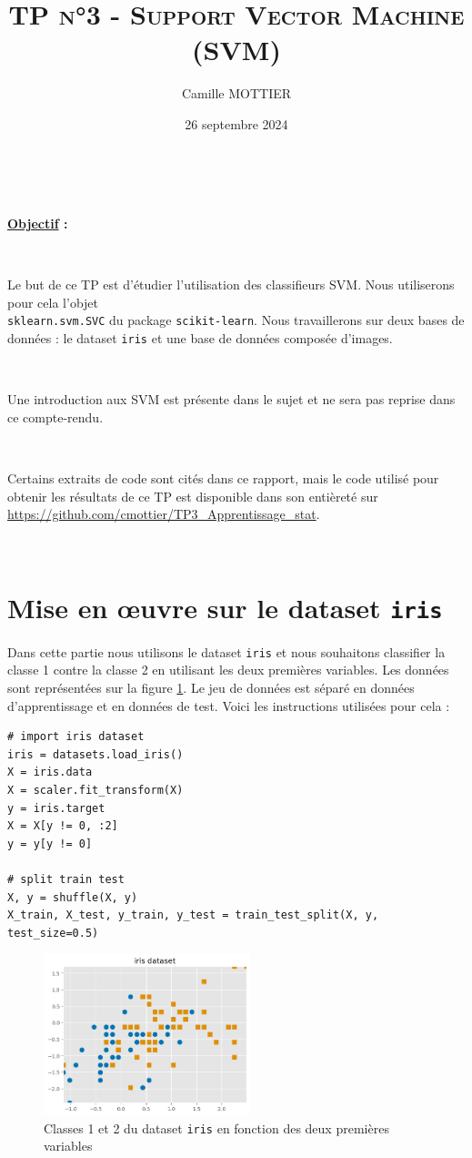 \documentclass[11pt,a4paper]{article}
\title{\textsc{TP n°3 - Support Vector Machine (SVM)}}
\author{Camille MOTTIER}
\date{26 septembre 2024}
\theoremstyle{definition}
\begin{document}
\maketitle

\



\textbf{\underline{Objectif} : }

\

Le but de ce TP est d'étudier l'utilisation des classifieurs SVM. Nous utiliserons pour cela l'objet \\
\texttt{sklearn.svm.SVC} du package \texttt{scikit-learn}. Nous travaillerons sur deux bases de données : le dataset \texttt{iris} et une base de données composée d'images.

\

Une introduction aux SVM est présente dans le sujet et ne sera pas reprise dans ce compte-rendu. 

\

Certains extraits de code sont cités dans ce rapport, mais le code utilisé pour obtenir les résultats de ce TP est disponible dans son entièreté sur \url{https://github.com/cmottier/TP3_Apprentissage_stat}.

\

\section{Mise en œuvre sur le dataset \texttt{iris}}

Dans cette partie nous utilisons le dataset \texttt{iris} et nous souhaitons classifier la classe 1 contre la classe 2 en utilisant les deux premières variables. Les données sont représentées sur la figure \ref{iris}. Le jeu de données est séparé en données d'apprentissage et en données de test. Voici les instructions utilisées pour cela :

\begin{verbatim}
# import iris dataset
iris = datasets.load_iris()
X = iris.data
X = scaler.fit_transform(X)
y = iris.target
X = X[y != 0, :2]
y = y[y != 0]

# split train test
X, y = shuffle(X, y)
X_train, X_test, y_train, y_test = train_test_split(X, y, test_size=0.5)
\end{verbatim}

\begin{figure}[h!]\centering
\includegraphics[width=6cm]{Images/iris.png}
\caption{Classes 1 et 2 du dataset \texttt{iris} en fonction des deux premières variables}
\label{iris}
\end{figure}
\end{document}
